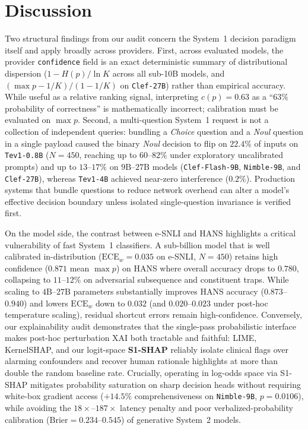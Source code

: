 \documentclass[10pt]{article}
\begin{document}
\section{Discussion}
Two structural findings from our audit concern the System~1 decision paradigm itself and apply broadly across providers.
First, across evaluated models, the provider \texttt{confidence} field is an exact deterministic summary of distributional dispersion ($1 - H(p)/\ln K$ across all sub-10B models, and $(\max p - 1/K)/(1 - 1/K)$ on \texttt{Clef-27B}) rather than empirical accuracy.
While useful as a relative ranking signal, interpreting $c(p) = 0.63$ as a ``$63\%$ probability of correctness'' is mathematically incorrect; calibration must be evaluated on $\max p$.
Second, a multi-question System~1 request is not a collection of independent queries: bundling a \emph{Choice} question and a \emph{Noul} question in a single payload caused the binary \emph{Noul} decision to flip on $22.4\%$ of inputs on \texttt{Tev1-0.8B} ($N=450$, reaching up to $60$--$82\%$ under exploratory uncalibrated prompts) and up to $13$--$17\%$ on $9\text{B}$--$27\text{B}$ models (\texttt{Clef-Flash-9B}, \texttt{Nimble-9B}, and \texttt{Clef-27B}), whereas \texttt{Tev1-4B} achieved near-zero interference ($0.2\%$).
Production systems that bundle questions to reduce network overhead can alter a model's effective decision boundary unless isolated single-question invariance is verified first.

On the model side, the contrast between e-SNLI and HANS highlights a critical vulnerability of fast System~1 classifiers.
A sub-billion model that is well calibrated in-distribution ($\text{ECE}_w = 0.035$ on e-SNLI, $N=450$) retains high confidence ($0.871$ mean $\max p$) on HANS where overall accuracy drops to $0.780$, collapsing to $11$--$12\%$ on adversarial subsequence and constituent traps.
While scaling to $4\text{B}$--$27\text{B}$ parameters substantially improves HANS accuracy ($0.873$--$0.940$) and lowers $\text{ECE}_w$ down to $0.032$ (and $0.020$--$0.023$ under post-hoc temperature scaling), residual shortcut errors remain high-confidence.
Conversely, our explainability audit demonstrates that the single-pass probabilistic interface makes post-hoc perturbation XAI both tractable and faithful: LIME, KernelSHAP, and our logit-space \textbf{S1-SHAP} reliably isolate clinical flags over alarming confounders and recover human rationale highlights at more than double the random baseline rate.
Crucially, operating in log-odds space via S1-SHAP mitigates probability saturation on sharp decision heads without requiring white-box gradient access ($+14.5\%$ comprehensiveness on \texttt{Nimble-9B}, $p = 0.0106$), while avoiding the $18\times$--$187\times$ latency penalty and poor verbalized-probability calibration ($\text{Brier} = 0.234$--$0.545$) of generative System~2 models.
\end{document}
